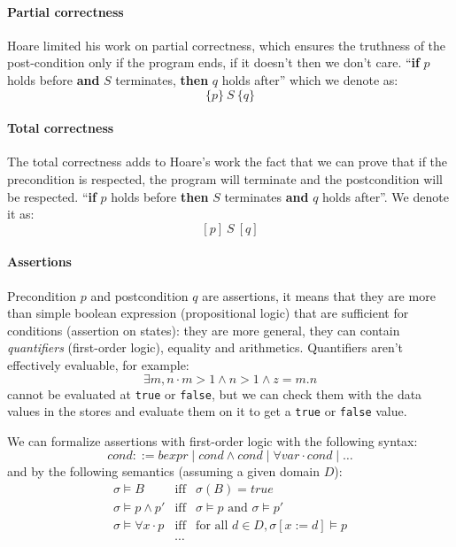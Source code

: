 \documentclass[12pt, a4paper]{book}
\begin{document}
\paragraph{Partial correctness} Hoare limited his work on partial correctness,
which ensures the truthness of the post-condition only if the program ends, if
it doesn't then we don't care. \enquote{\textbf{if} $p$ holds before
\textbf{and} $S$ terminates, \textbf{then} $q$ holds after} which we denote as:
$$
\{p\}\ S\ \{q\}
$$

\paragraph{Total correctness} The total correctness adds to Hoare's work the
fact that we can prove that if the precondition is respected, the program will
terminate and the postcondition will be respected. \enquote{\textbf{if} $p$
holds before \textbf{then} $S$ terminates \textbf{and} $q$ holds after}. We
denote it as:
$$
[p]\ S\ [q]
$$

\paragraph{Assertions} Precondition $p$ and postcondition $q$ are assertions, it
means that they are more than simple boolean expression (propositional logic)
that are sufficient for conditions (assertion on states): they are more general,
they can contain \textit{quantifiers} (first-order logic), equality and
arithmetics. Quantifiers aren't effectively evaluable, for example:
$$
\exists m, n \cdot m > 1 \land n > 1 \land z = m.n
$$
cannot be evaluated at \verb#true# or \verb#false#, but we can check them with
the data values in the stores and evaluate them on it to get a \verb#true# or
\verb#false# value. \newline

We can formalize assertions with first-order logic with the following syntax:
$$
cond ::= bexpr \mid cond \land cond \mid \forall var \cdot cond \mid \ldots
$$
and by the following semantics (assuming a given domain $D$):
\begin{eqnarray*}
    \sigma \vDash B          & \textrm{iff} & \sigma(B) = true \\
    \sigma \vDash p \land p' & \textrm{iff} & \sigma \vDash p \textrm{ and } \sigma \vDash p' \\
    \sigma \vDash \forall x \cdot p & \textrm{iff} & \textrm{for all } d \in D, \sigma[x:=d] \vDash p \\
    & \cdots &
\end{eqnarray*}
\end{document}
